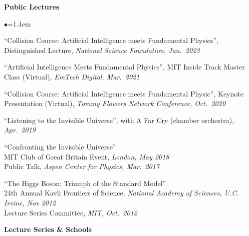 \documentclass[11pt]{article}
\newcommand{\sh}{\phantom{.....}}
\newcommand{\bbl}{\begin{list}{$\bullet$}{\leftmargin=1.4em \itemsep=-1pt}}
\newcommand{\el}{\end{list}}
\begin{document}

\noindent \textbf{Public Lectures}


\bbl
\item ``Collision Course: Artificial Intelligence meets Fundamental Physics'', Distinguished Lecture, \textit{National Science Foundation, Jan.~2023}
\item ``Artificial Intelligence Meets Fundamental Physics'', MIT Inside Track Master Class (Virtual), \textit{EmTech Digital, Mar.~2021}
\item ``Collision Course: Artificial Intelligence meets Fundamental Physic'', Keynote Presentation (Virtual), \textit{Tommy Flowers Network Conference, Oct.~2020}
\item ``Listening to the Invisible Universe'', with A Far Cry (chamber orchestra), \textit{Apr.~2019}
\item ``Confronting the Invisible Universe''
\\ \sh MIT Club of Great Britain Event, \textit{London, May 2018}
\\ \sh Public Talk, \textit{Aspen Center for Physics, Mar.~2017}
\item ``The Higgs Boson: Triumph of the Standard Model''
\\ \sh 24th Annual Kavli Frontiers of Science, \textit{National Academy of Sciences, U.C. Irvine, Nov 2012}
\\ \sh Lecture Series Committee, \textit{MIT, Oct.~2012}
\el 


\noindent \textbf{Lecture Series \& Schools}
\end{document}
